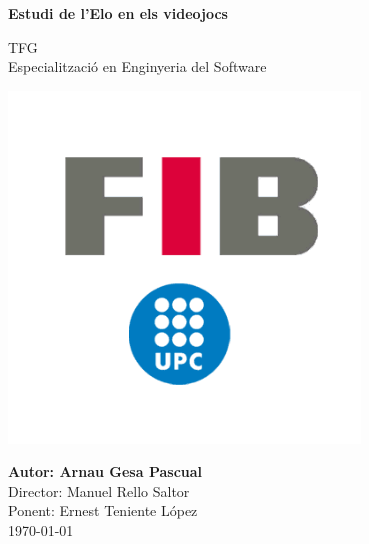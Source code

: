 \begin{titlepage}
    \begin{center}
        \vspace*{1cm}
            
        \Huge
        \textbf{Estudi de l'Elo en els videojocs}
            
        \vspace{0.5cm}
        \Large
        TFG\\
        Especialització en Enginyeria del Software
            
        \vspace{0.7cm}
            
        \includegraphics[width=0.7\textwidth]{images/logo-fib.png}
            
        \vfill
        \Large
        \textbf{Autor: Arnau Gesa Pascual}\\
        Director: Manuel Rello Saltor\\
        Ponent: Ernest Teniente López\\
        \today\\
            
    \end{center}
\end{titlepage}